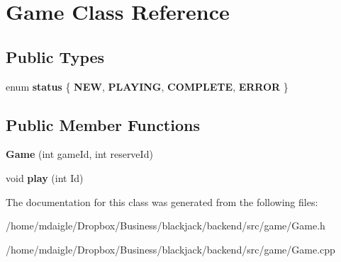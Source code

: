 \hypertarget{classGame}{
\section{\-Game \-Class \-Reference}
\label{d9/d68/classGame}
}
\subsection*{\-Public \-Types}
\begin{DoxyCompactItemize}
\item 
enum {\bfseries status} \{ {\bfseries \-N\-E\-W}, 
{\bfseries \-P\-L\-A\-Y\-I\-N\-G}, 
{\bfseries \-C\-O\-M\-P\-L\-E\-T\-E}, 
{\bfseries \-E\-R\-R\-O\-R}
 \}
\end{DoxyCompactItemize}
\subsection*{\-Public \-Member \-Functions}
\begin{DoxyCompactItemize}
\item 
\hypertarget{classGame_a4da6bd8011ce4545f766a3ea1a6c49f5}{
{\bfseries \-Game} (int game\-Id, int reserve\-Id)}
\label{d9/d68/classGame_a4da6bd8011ce4545f766a3ea1a6c49f5}

\item 
\hypertarget{classGame_a892e25a1b0166e4d86db8cb8cd7dc089}{
void {\bfseries play} (int \-Id)}
\label{d9/d68/classGame_a892e25a1b0166e4d86db8cb8cd7dc089}

\end{DoxyCompactItemize}


\-The documentation for this class was generated from the following files\-:\begin{DoxyCompactItemize}
\item 
/home/mdaigle/\-Dropbox/\-Business/blackjack/backend/src/game/\-Game.\-h\item 
/home/mdaigle/\-Dropbox/\-Business/blackjack/backend/src/game/\-Game.\-cpp\end{DoxyCompactItemize}
